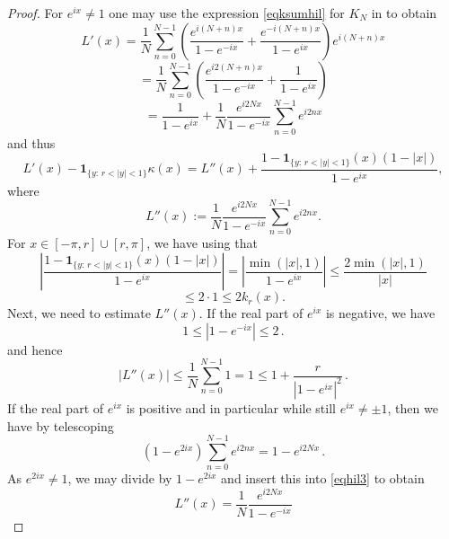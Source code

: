 \documentclass[10pt,a4paper]{article}
\theoremstyle{plain}
\theoremstyle{definition}
\numberwithin{equation}{subsection}
\begin{document}
\begin{proof}
For $e^{ix}\neq 1$
one may use the expression
\eqref{eqksumhil} for $K_N$
in  to obtain
\begin{equation*}
    {L'}(x)= \frac 1N\sum_{n=0}^{N-1}
     \left(\frac{e^{i(N+n)x}}{1-e^{-ix}}
      +\frac {e^{-i(N+n)x}}{1-e^{ix}}\right) e^{i(N+n)x}
\end{equation*}
\begin{equation*}
    = \frac 1N\sum_{n=0}^{N-1}
    \left(\frac{e^{i2(N+n)x}}{1-e^{-ix}}
      +\frac {1}{1-e^{ix}}\right)
\end{equation*}
\begin{equation}\label{eqhil3}
    = \frac{1}{1-e^{ix}} +
     \frac 1N \frac {e^{i2Nx}}{1-e^{-ix}}
     \sum_{n=0}^{N-1}
    {e^{i2nx}}
\end{equation}
and thus
\begin{equation}
\label{eq-L'L''}
  {L'}(x) -\mathbf{1}_{\{y:\, r<|y|<1\}}\kappa(x)=L''(x)+ \frac{1-\mathbf{1}_{{\{y:\, r<|y|<1\}}}(x)(1-|x|)}{1-e^{ix}},
\end{equation}
where
$$L''(x):=\frac 1N \frac {e^{i2Nx}}{1-e^{-ix}}
     \sum_{n=0}^{N-1}
    {e^{i2nx}}.$$
For $x\in [-\pi, r]\cup [r, \pi]$, we have using  that
\begin{equation*}
   \left|\frac{1-\mathbf{1}_{{\{y:\, r<|y|<1\}}}(x)(1-|x|)}{1-e^{ix}} \right|=\left|\frac{\min(|x|, 1)}{1-e^{ix}} \right|\leq \frac{2\min(|x|, 1)}{|x|}
\end{equation*}
\begin{equation}
 \label{eq-diffzero2}
    \leq 2\cdot 1\leq 2 k_r(x).
\end{equation}
Next, we need to estimate $L''(x)$. If the real part of
$e^{ix}$ is negative, we have
\begin{equation}
  1\le |1-e^{-ix}|\le 2\, .
\end{equation}
and hence
\begin{equation}\label{eqhil12}
    |L''(x)|\le
     \frac 1N
     \sum_{n=0}^{N-1}
    1=1\le 1+\frac r{|1-e^{ix}|^2}\, .
\end{equation}
If the real part of $e^{ix}$ is positive and in particular while still $e^{ix}\neq \pm 1$, then we have by telescoping
\begin{equation}
 (1-e^{2ix})
     \sum_{n=0}^{N-1}
    {e^{i2nx}}=1-e^{i2Nx}\, .
\end{equation}
As $e^{2ix}\neq 1$, we may divide by $1-e^{2ix}$ and insert this into
\eqref{eqhil3} to obtain
\begin{equation}
 L''(x)=
           \frac 1N \frac {e^{i2Nx}}{1-e^{-ix}}

\end{equation}
\end{proof}
\end{document}
